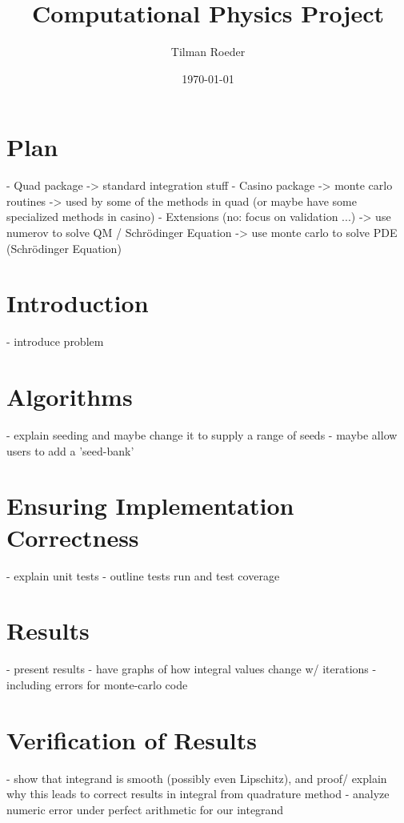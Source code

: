 \documentclass[10pt, a4paper]{article}
\title{Computational Physics Project}
\author{Tilman Roeder}
\date{\today}
\begin{document}
\maketitle

\section{Plan}
- Quad package -> standard integration stuff
- Casino package -> monte carlo routines
  -> used by some of the methods in quad (or maybe have some specialized methods in casino)
- Extensions (no: focus on validation ...)
  -> use numerov to solve QM / Schrödinger Equation
  -> use monte carlo to solve PDE (Schrödinger Equation)

\section{Introduction}

- introduce problem

\section{Algorithms}

- explain seeding and maybe change it to supply a range of seeds
  - maybe allow users to add a 'seed-bank'

\section{Ensuring Implementation Correctness}

- explain unit tests
- outline tests run and test coverage

\section{Results}

- present results
- have graphs of how integral values change w/ iterations
  - including errors for monte-carlo code

\section{Verification of Results}

- show that integrand is smooth (possibly even Lipschitz), and proof/ explain why this leads to
  correct results in integral from quadrature method
  - analyze numeric error under perfect arithmetic for our integrand
\end{document}
